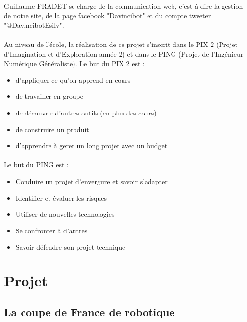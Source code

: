 \documentclass[12pt,a4paper]{article}
\begin{document}
\paragraph{}
Guillaume FRADET se charge de la communication web, c'est 
à dire la gestion de notre site, de la page facebook "Davincibot" et du compte 
tweeter "@DavincibotEsilv".

\paragraph{}
Au niveau de l'école, la réalisation de ce projet s'inscrit dans le PIX 2 (Projet d'Imagination
et d'Exploration année 2) et dans le PING (Projet de l'Ingénieur Numérique Généraliste). 
Le but du PIX 2 est : 

\begin{itemize}
\item d'appliquer ce qu'on apprend en cours
\item de travailler en groupe 
\item de découvrir d'autres outils (en plus des cours)
\item de construire un produit 
\item d'apprendre à gerer un long projet avec un budget
\end{itemize}

\paragraph{}
Le but du PING est :

\begin{itemize}
\item Conduire un projet d’envergure et savoir s’adapter
\item Identifier et évaluer les risques
\item Utiliser de nouvelles technologies
\item Se confronter à d’autres
\item Savoir défendre son projet technique
\end{itemize}

\section{Projet}

\subsection{La coupe de France de robotique}
\end{document}
